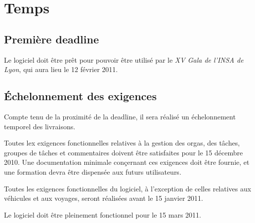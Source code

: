 \section{Temps}
\subsection{Première deadline}
Le logiciel doit être prêt pour pouvoir être utilisé par le \emph{XV\ieme{} Gala de l'INSA de Lyon}, qui aura lieu le 12 février 2011.
\subsection{Échelonnement des exigences}
Compte tenu de la proximité de la deadline, il sera réalisé un échelonnement temporel des livraisons.

Toutes lex exigences fonctionnelles relatives à la gestion des orgas, des tâches, groupes de tâches et commentaires doivent être satisfaites pour le 15 décembre 2010. Une documentation minimale conçernant ces exigences doit être fournie, et une formation devra être dispensée aux futurs utilisateurs.

Toutes les exigences fonctionnelles du logiciel, à l'exception de celles relatives aux véhicules et aux voyages, seront réalisées avant le 15 janvier 2011.

Le logiciel doit être pleinement fonctionnel pour le 15 mars 2011.